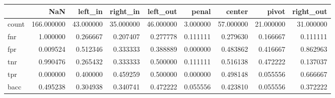 \begin{tabular}{lrrrrrrrr}
\toprule
{} &         NaN &    left\_in &   right\_in &   left\_out &     penal &     center &      pivot &  right\_out \\
\midrule
count &  166.000000 &  43.000000 &  35.000000 &  46.000000 &  3.000000 &  57.000000 &  21.000000 &  31.000000 \\
fnr   &    1.000000 &   0.266667 &   0.207407 &   0.277778 &  0.111111 &   0.279630 &   0.166667 &   0.111111 \\
fpr   &    0.009524 &   0.512346 &   0.333333 &   0.388889 &  0.000000 &   0.483862 &   0.416667 &   0.862963 \\
tnr   &    0.990476 &   0.265432 &   0.333333 &   0.500000 &  0.111111 &   0.516138 &   0.472222 &   0.137037 \\
tpr   &    0.000000 &   0.400000 &   0.459259 &   0.500000 &  0.000000 &   0.498148 &   0.055556 &   0.666667 \\
bacc  &    0.495238 &   0.304938 &   0.340741 &   0.472222 &  0.055556 &   0.423810 &   0.055556 &   0.372222 \\
\bottomrule
\end{tabular}
